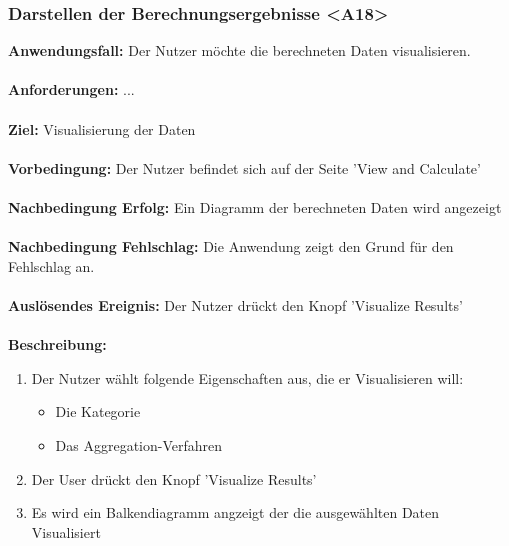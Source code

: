 \documentclass[parskip=full]{scrartcl} %
\begin{document}
\subsubsection*{Darstellen der Berechnungsergebnisse <A18>}
\textbf{Anwendungsfall:} Der Nutzer möchte die berechneten Daten visualisieren.\\\\
\textbf{Anforderungen:} ...\\\\
\textbf{Ziel:} Visualisierung der Daten\\\\
\textbf{Vorbedingung:}  Der Nutzer befindet sich auf der Seite 'View and Calculate'\\\\
\textbf{Nachbedingung Erfolg:} Ein Diagramm der berechneten Daten wird angezeigt \\\\
\textbf{Nachbedingung Fehlschlag:} Die Anwendung zeigt den Grund für den Fehlschlag an.\\\\
\textbf{Auslösendes Ereignis:} Der Nutzer drückt den Knopf 'Visualize Results' \\\\
\textbf{Beschreibung:}
\begin{enumerate}
    \item Der Nutzer wählt folgende Eigenschaften aus, die er Visualisieren will:
    \begin{itemize}
        \item Die Kategorie
        \item Das Aggregation-Verfahren
    \end{itemize}
    \item Der User drückt den Knopf 'Visualize Results'
    \item Es wird ein Balkendiagramm angzeigt der die ausgewählten Daten Visualisiert
\end{enumerate}
\newpage
\end{document}
